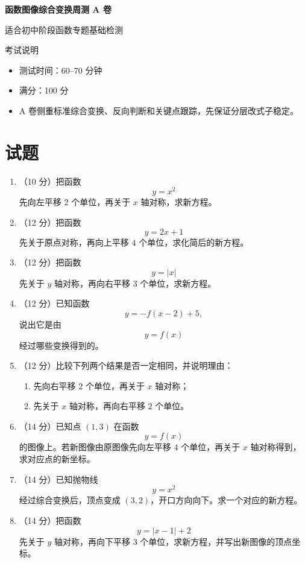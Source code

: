 \documentclass[11pt,a4paper,fontset=fandol]{ctexart}
\newcommand{\answerspace}{\vspace{2.3cm}}
\newcommand{\biganswerspace}{\vspace{3.1cm}}
\begin{document}
\thispagestyle{empty}
\begin{center}
{\fontsize{22}{28}\selectfont\bfseries 函数图像综合变换周测 A 卷\par}
\vspace{0.4cm}
{\large 适合初中阶段函数专题基础检测\par}
\end{center}

\begin{infobox}{考试说明}
\begin{itemize}
  \item 测试时间：60--70 分钟
  \item 满分：100 分
  \item A 卷侧重标准综合变换、反向判断和关键点跟踪，先保证分层改式子稳定。
\end{itemize}
\end{infobox}

\section{试题}

\begin{enumerate}
  \item （10 分）把函数
  \[
  y=x^2
  \]
  先向左平移 $2$ 个单位，再关于 \(x\) 轴对称，求新方程。
  \answerspace

  \item （12 分）把函数
  \[
  y=2x+1
  \]
  先关于原点对称，再向上平移 $4$ 个单位，求化简后的新方程。
  \answerspace

  \item （12 分）把函数
  \[
  y=|x|
  \]
  先关于 \(y\) 轴对称，再向右平移 $3$ 个单位，求新方程。
  \answerspace

  \item （12 分）已知函数
  \[
  y=-f(x-2)+5,
  \]
  说出它是由
  \[
  y=f(x)
  \]
  经过哪些变换得到的。
  \answerspace

  \item （12 分）比较下列两个结果是否一定相同，并说明理由：
  \begin{enumerate}
    \item 先向右平移 $2$ 个单位，再关于 \(x\) 轴对称；
    \item 先关于 \(x\) 轴对称，再向右平移 $2$ 个单位。
  \end{enumerate}
  \answerspace

  \item （14 分）已知点 \((1,3)\) 在函数
  \[
  y=f(x)
  \]
  的图像上。若新图像由原图像先向左平移 $4$ 个单位，再关于 \(x\) 轴对称得到，求对应点的新坐标。
  \biganswerspace

  \item （14 分）已知抛物线
  \[
  y=x^2
  \]
  经过综合变换后，顶点变成 \((3,2)\)，开口方向向下。求一个对应的新方程。
  \biganswerspace

  \item （14 分）把函数
  \[
  y=|x-1|+2
  \]
  先关于 \(y\) 轴对称，再向下平移 $3$ 个单位，求新方程，并写出新图像的顶点坐标。
  \biganswerspace
\end{enumerate}
\end{document}

